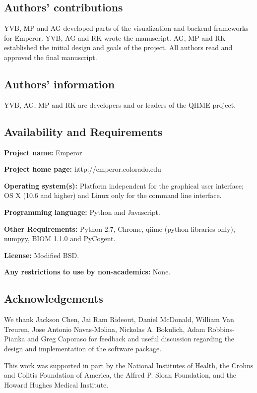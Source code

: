 \subsection{Authors' contributions}
YVB, MP and AG developed parts of the visualization and backend frameworks for Emperor. YVB, AG and RK wrote the manuscript. AG, MP and RK established the initial design and goals of the project. All authors read and approved the final manuscript.

\subsection{Authors' information}
YVB, AG, MP and RK are developers and or leaders of the QIIME project.

\subsection{Availability and Requirements}

\textbf{Project name:} Emperor

\textbf{Project home page:} http://emperor.colorado.edu

\textbf{Operating system(s):} Platform independent for the graphical user interface; OS X (10.6 and higher) and Linux only for the command line interface.

\textbf{Programming language:} Python and Javascript.

\textbf{Other Requirements:} Python 2.7, Chrome, \gls{qiime} (python libraries only), \gls{numpy}y, BIOM 1.1.0 and PyCogent.

\textbf{License:} Modified BSD.

\textbf{Any restrictions to use by non\hyp{}academics:} None.

\subsection{Acknowledgements}

We thank Jackson Chen, Jai Ram Rideout, Daniel McDonald, William Van Treuren, Jose Antonio Navas\hyp{}Molina, Nickolas A. Bokulich, Adam Robbins\hyp{}Pianka and Greg Caporaso for feedback and useful discussion regarding the design and implementation of the software package.
 
This work was supported in part by the National Institutes of Health, the Crohns and Colitis Foundation of America, the Alfred P. Sloan Foundation, and the Howard Hughes Medical Institute.
